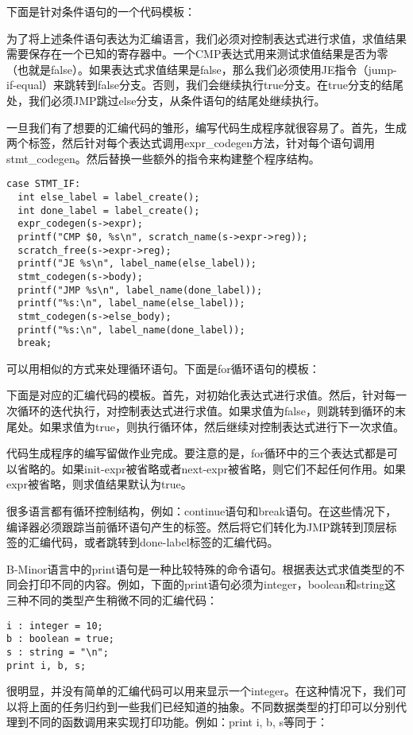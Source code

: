 \documentclass[cn,11pt,chinese]{elegantbook}
\begin{document}
下面是针对条件语句的一个代码模板：

为了将上述条件语句表达为汇编语言，我们必须对控制表达式进行求值，求值结果需要保存在一个已知的寄存器中。一个CMP表达式用来测试求值结果是否为零（也就是false）。如果表达式求值结果是false，那么我们必须使用JE指令（jump-if-equal）来跳转到false分支。否则，我们会继续执行true分支。在true分支的结尾处，我们必须JMP跳过else分支，从条件语句的结尾处继续执行。

一旦我们有了想要的汇编代码的雏形，编写代码生成程序就很容易了。首先，生成两个标签，然后针对每个表达式调用expr\_codegen方法，针对每个语句调用stmt\_codegen。然后替换一些额外的指令来构建整个程序结构。

\begin{verbatim}
case STMT_IF:
  int else_label = label_create();
  int done_label = label_create();
  expr_codegen(s->expr);
  printf("CMP $0, %s\n", scratch_name(s->expr->reg));
  scratch_free(s->expr->reg);
  printf("JE %s\n", label_name(else_label));
  stmt_codegen(s->body);
  printf("JMP %s\n", label_name(done_label));
  printf("%s:\n", label_name(else_label));
  stmt_codegen(s->else_body);
  printf("%s:\n", label_name(done_label));
  break;
\end{verbatim}

可以用相似的方式来处理循环语句。下面是for循环语句的模板：

下面是对应的汇编代码的模板。首先，对初始化表达式进行求值。然后，针对每一次循环的迭代执行，对控制表达式进行求值。如果求值为false，则跳转到循环的末尾处。如果求值为true，则执行循环体，然后继续对控制表达式进行下一次求值。

代码生成程序的编写留做作业完成。要注意的是，for循环中的三个表达式都是可以省略的。如果init-expr被省略或者next-expr被省略，则它们不起任何作用。如果expr被省略，则求值结果默认为true。

很多语言都有循环控制结构，例如：continue语句和break语句。在这些情况下，编译器必须跟踪当前循环语句产生的标签。然后将它们转化为JMP跳转到顶层标签的汇编代码，或者跳转到done-label标签的汇编代码。

B-Minor语言中的print语句是一种比较特殊的命令语句。根据表达式求值类型的不同会打印不同的内容。例如，下面的print语句必须为integer，boolean和string这三种不同的类型产生稍微不同的汇编代码：

\begin{verbatim}
i : integer = 10;
b : boolean = true;
s : string = "\n";
print i, b, s;
\end{verbatim}

很明显，并没有简单的汇编代码可以用来显示一个integer。在这种情况下，我们可以将上面的任务归约到一些我们已经知道的抽象。不同数据类型的打印可以分别代理到不同的函数调用来实现打印功能。例如：print i, b, s等同于：
\end{document}
